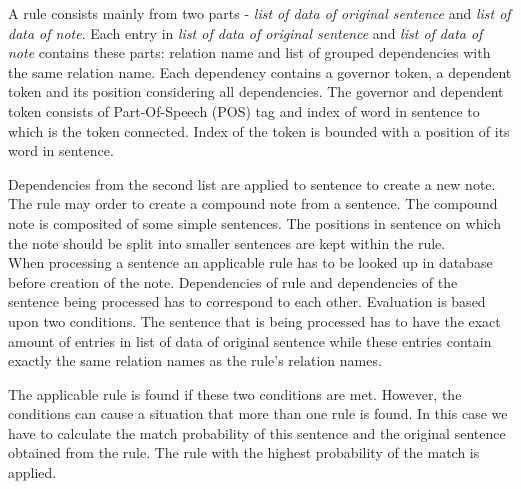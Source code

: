 \documentclass{iitsrc}
\begin{document}
		A rule consists mainly from two parts - \textit{list of data of original sentence} and \textit{list of data of note}. Each entry in \textit{list of data of original sentence} and \textit{list of data of note} contains these parts: relation name and list of grouped dependencies with the same relation name. Each dependency contains a governor token, a dependent token and its position considering all dependencies. The governor and dependent token consists of Part-Of-Speech (POS) tag and index of word in sentence to which is the token connected. Index of the token is bounded with a position of its word in sentence.
		
		Dependencies from the second list are applied to sentence to create a new note. The rule may order to create a compound note from a sentence. The compound note is composited of some simple sentences. The positions in sentence on which the note should be split into smaller sentences are kept within the rule. \\
		
		When processing a sentence an applicable rule has to be looked up in database before creation of the note. Dependencies of rule and dependencies of the sentence being processed has to correspond to each other. Evaluation is based upon two conditions. The sentence that is being processed has to have the exact amount of entries in list of data of original sentence while these entries contain exactly the same relation names as the rule's relation names.
			
		The applicable rule is found if these two conditions are met. However, the conditions can cause a situation that more than one rule is found. In this case we have to calculate the match probability of this sentence and the original sentence obtained from the rule. The rule with the highest probability of the match is applied.
			
\end{document}
